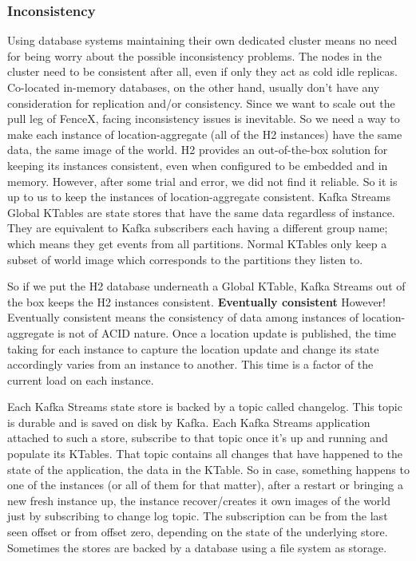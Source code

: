 \documentclass[a4]{report}
\begin{document}
    \subsubsection{Inconsistency}
    Using database systems maintaining their own dedicated cluster means no need for being worry about the
    possible inconsistency problems.
    The nodes in the cluster need to be consistent after all, even if only they act as cold idle replicas.
    Co-located in-memory databases, on the other hand, usually don't have any consideration for replication and/or consistency.
    Since we want to scale out the pull leg of FenceX, facing inconsistency issues is inevitable.
    So we need a way to make each instance of location-aggregate (all of the H2 instances) have the same data, the same image of the world.
    H2 provides an out-of-the-box solution for keeping its instances consistent, even when configured to be embedded
    and in memory.
    However, after some trial and error, we did not find it reliable.
    So it is up to us to keep the instances of location-aggregate consistent.
    Kafka Streams Global KTables are state stores that have the same data regardless of instance.
    They are equivalent to Kafka subscribers each having a different group name;
    which means they get events from all partitions.
    Normal KTables only keep a subset of world image which corresponds to the partitions they listen to.

    So if we put the H2 database underneath a Global KTable, Kafka Streams out of the box keeps the H2 instances consistent.
    \textbf{Eventually consistent} However!
    Eventually consistent means the consistency of data among instances of location-aggregate is not of ACID nature.
    Once a location update is published, the time taking for each instance to capture the location update and change its state accordingly varies from an instance to another.
    This time is a factor of the current load on each instance.

    Each Kafka Streams state store is backed by a topic called changelog.
    This topic is durable and is saved on disk by Kafka.
    Each Kafka Streams application attached to such a store, subscribe to that topic once it's up and running and populate its KTables.
    That topic contains all changes that have happened to the state of the application, the data in the KTable.
    So in case, something happens to one of the instances (or all of them for that matter), after a restart or bringing a new fresh instance up, the instance recover/creates it own images of the world just by subscribing to change log topic.
    The subscription can be from the last seen offset or from offset zero, depending on the state of the underlying store.
    Sometimes the stores are backed by a database using a file system as storage.
\end{document}
